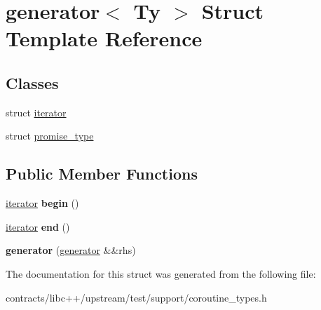 \hypertarget{structgenerator}{}\section{generator$<$ Ty $>$ Struct Template Reference}
\label{structgenerator}
\subsection*{Classes}
\begin{DoxyCompactItemize}
\item 
struct \mbox{\hyperlink{structgenerator_1_1iterator}{iterator}}
\item 
struct \mbox{\hyperlink{structgenerator_1_1promise__type}{promise\+\_\+type}}
\end{DoxyCompactItemize}
\subsection*{Public Member Functions}
\begin{DoxyCompactItemize}
\item 
\mbox{\label{structgenerator_a8eaba6fed6c524fc0cf17dbaadb9c6fb}} 
\mbox{\hyperlink{structgenerator_1_1iterator}{iterator}} {\bfseries begin} ()
\item 
\mbox{\label{structgenerator_a50f44c94348a55a638cbe0a274d64ee4}} 
\mbox{\hyperlink{structgenerator_1_1iterator}{iterator}} {\bfseries end} ()
\item 
\mbox{\label{structgenerator_a2e214ae9e9f32b48dbd7301231c01f93}} 
{\bfseries generator} (\mbox{\hyperlink{structgenerator}{generator}} \&\&rhs)
\end{DoxyCompactItemize}


The documentation for this struct was generated from the following file\+:\begin{DoxyCompactItemize}
\item 
contracts/libc++/upstream/test/support/coroutine\+\_\+types.\+h\end{DoxyCompactItemize}

